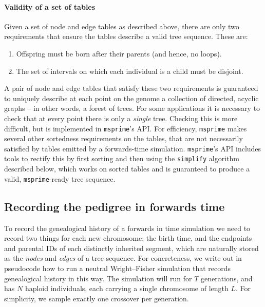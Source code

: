 \documentclass{article}
\newcommand{\msprime}{\texttt{msprime}}
\newcommand{\jda}[1]{{\em \color{cyan} #1}}
\begin{document}
\paragraph{Validity of a set of tables}
Given a set of node and edge tables as described above,
there are only two requirements that ensure the tables
describe a valid tree sequence.
These are:
\begin{enumerate}
    \item Offspring must be born after their parents (and hence, no loops).
    \item The set of intervals on which each individual is a child must be disjoint.
\end{enumerate}
A pair of node and edge tables that satisfy these two requirements
is guaranteed to uniquely describe at each point on the genome
a collection of directed, acyclic graphs -- in other words, a forest of trees.
For some applications it is necessary to check that at every point
there is only a \emph{single} tree.
Checking this is more difficult, but is implemented in \msprime{}'s API.
For efficiency, \msprime{} makes several other sortedness requirements on the tables,
that are not necessarily satisfied by tables emitted by a forwards-time simulation.
\msprime{}'s API includes tools to rectify this by first sorting %
and then using the \texttt{simplify} algorithm described below, which works on sorted tables
and is guaranteed to produce a valid, \msprime{}-ready tree sequence.


\subsection*{Recording the pedigree in forwards time}

To record the genealogical history of a forwards in time simulation
we need to record two things for each new chromosome:
the birth time, and the endpoints and parental IDs of each distinctly inherited segment,
which are naturally stored as the \emph{nodes} and \emph{edges} of a tree sequence.
For concreteness, we write out in pseudocode how to run a neutral Wright--Fisher simulation
that records genealogical history in this way.
The simulation will run for $T$ generations,
and has $N$ haploid individuals, each carrying a single chromosome of length $L$.
For simplicity, we sample exactly one crossover per generation.
\end{document}
